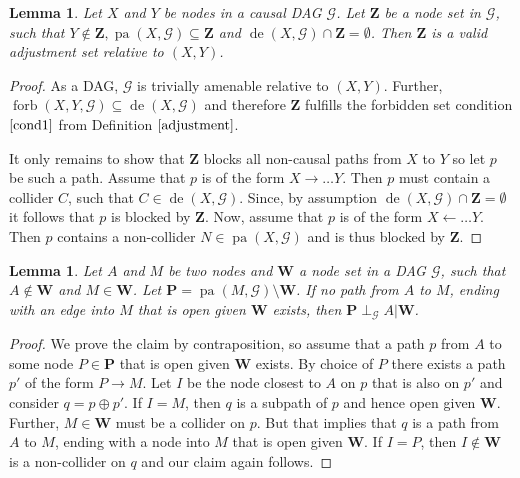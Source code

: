 \documentclass[11pt,a4paper]{article}
\newtheorem{Lemma}[Satz]{Lemma}
\theoremstyle{definition}
\theoremstyle{remark}
\DeclareMathOperator{\Forbb}{forb}
\DeclareMathOperator{\pa}{pa}
\DeclareMathOperator{\de}{de}
\newcommand{\g}[1][G]{\mathcal{#1}}
\newcommand{\f}[2][X,Y]{\Forbb(#1,#2)}
\begin{document}
\begin{Lemma}
	Let $X$ and $Y$ be nodes in a causal DAG $\g$. Let $\mathbf{Z}$ be a node set in $\g$, such that $Y \notin \mathbf{Z}, \pa(X,\g) \subseteq \mathbf{Z}$ and $\de(X,\g) \cap \mathbf{Z} = \emptyset$. Then $\mathbf{Z}$ is a valid adjustment set relative to $(X,Y)$.
	\label{lemma:alwaysVAS}
\end{Lemma}

\begin{proof}
	As a DAG, $\g$ is trivially amenable relative to $(X,Y)$. Further, $\f{\g} \subseteq \de(X,\g)$ and therefore $\mathbf{Z}$ fulfills the forbidden set condition $\eqref{cond1}$ from Definition $\ref{adjustment}$. 
	
	It only remains to show that $\mathbf{Z}$ blocks all non-causal paths from $X$ to $Y$ so let $p$ be such a path. Assume that $p$ is of the form $X \rightarrow \dots Y$. Then $p$ must contain a collider $C$, such that $C \in \de(X,\g)$. Since, by assumption $\de(X,\g) \cap \mathbf{Z} = \emptyset$ it follows that $p$ is blocked by $\mathbf{Z}$. Now, assume that $p$ is of the form $X \leftarrow \dots Y$. Then $p$ contains a non-collider $N \in \pa(X,\g)$ and is thus blocked by $\mathbf{Z}$.  
\end{proof}


\begin{Lemma}
	Let $A$ and $M$ be two nodes and $\mathbf{W}$ a node set in a DAG $\g$, such that $A \notin \mathbf{W}$ and $M \in \mathbf{W}$. Let $\mathbf{P} = \pa(M,\g) \setminus \mathbf{W}$. If no path from $A$ to $M$, ending with an edge into $M$ that is open given $\mathbf{W}$ exists, then $\mathbf{P} \perp_{\g} A | \mathbf{W}$.
	\label{lemma:edgeinto}
\end{Lemma}

\begin{proof}
We prove the claim by contraposition, so assume that a path $p$ from $A$ to some node $P \in \mathbf{P}$ that is open given $\mathbf{W}$ exists. By choice of $P$ there exists a path $p'$ of the form $P \rightarrow M$. Let $I$ be the node closest to $A$ on $p$ that is also on $p'$ and consider $q=p\oplus p'$. If $I=M$, then $q$ is a subpath of $p$ and hence open given $\mathbf{W}$. Further, $M \in \mathbf{W}$ must be a collider on $p$. But that implies that $q$ is a path from $A$ to $M$, ending with a node into $M$ that is open given $\mathbf{W}$. If $I=P$, then $I\notin \mathbf{W}$ is a non-collider on $q$ and our claim again follows. 
\end{proof}
\end{document}
